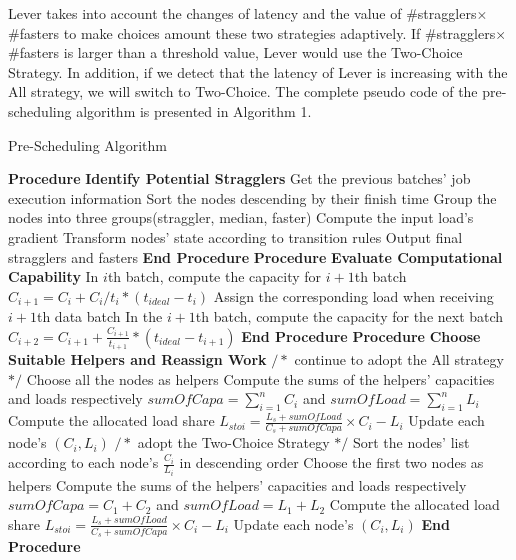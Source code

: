 Lever takes into account the changes of latency and the value of
\#stragglers$\times$\#fasters to
make choices amount these two strategies adaptively. If \#stragglers$\times$\#fasters is larger than a threshold
value, Lever would use the Two-Choice Strategy. In addition, if
we detect that the latency of Lever is increasing with the All strategy,
we will switch to Two-Choice. The complete pseudo code of the pre-scheduling
algorithm is presented in Algorithm 1.
  \begin{algorithm}[htbp]
  \small
  \caption{Pre-Scheduling Algorithm}
  \label{Alg:1}
  \begin{algorithmic}[1]
  \STATE \textbf{Procedure} \textbf{Identify Potential Stragglers}
  \STATE \quad Get the previous batches' job execution information
  \STATE \quad Sort the nodes descending by their finish time
  \STATE \quad Group the nodes into three groups(straggler, median, faster)
  \STATE \quad Compute the input load's gradient
  \STATE \quad Transform nodes' state according to transition rules
  \STATE \quad Output final stragglers and fasters
  \STATE \textbf{End Procedure}
  \STATE \textbf{Procedure} \textbf{Evaluate Computational Capability}
  \STATE \quad In $i$th batch, compute the capacity for $i+1$th batch 
  \STATE \quad $C_{i+1} = C_i + C_i/t_i*(t_{ideal}-t_i)$
  \STATE \quad Assign the corresponding load when receiving $i+1$th data batch
  \STATE \quad In the $i+1$th batch, compute the capacity for the next batch
  \STATE \quad $C_{i+2} = C_{i+1} + \frac{C_{i+1}}{t_{i+1}}*(t_{ideal}-t_{i+1})$
  \STATE \textbf{End Procedure}
  \STATE \textbf{Procedure} \textbf{Choose Suitable Helpers and Reassign Work}
  \STATE $/*$ continue to adopt the All strategy $*/$
  \STATE Choose all the nodes as helpers
  \STATE Compute the sums of the helpers' capacities and loads respectively
  \STATE $sumOfCapa=\sum_{i=1}^n C_i$ and $sumOfLoad=\sum_{i=1}^n L_i$
  \STATE Compute the allocated load share
  \STATE $L_{stoi}=\frac{L_s + sumOfLoad}{C_s + sumOfCapa}\times C_i-L_i$
  \STATE Update each node's $(C_i,L_i)$
  \ENDFOR
  \ENDFOR
  \ELSE
  \STATE $/*$ adopt the Two-Choice Strategy $*/$
  \STATE Sort the nodes' list according to each node's $\frac{C_i}{L_i}$ in descending order
  \STATE Choose the first two nodes as helpers
  \STATE Compute the sums of the helpers' capacities and loads respectively
  \STATE $sumOfCapa = C_1 + C_2$ and $sumOfLoad = L_1 + L_2$
  \STATE Compute the allocated load share
  \STATE $L_{stoi}=\frac{L_s + sumOfLoad}{C_s + sumOfCapa}\times C_i-L_i$
  \STATE Update each node's $(C_i,L_i)$
  \ENDFOR
  \ENDFOR
  \ENDIF
  \STATE \textbf{End Procedure}
  \end{algorithmic}
  \end{algorithm}
